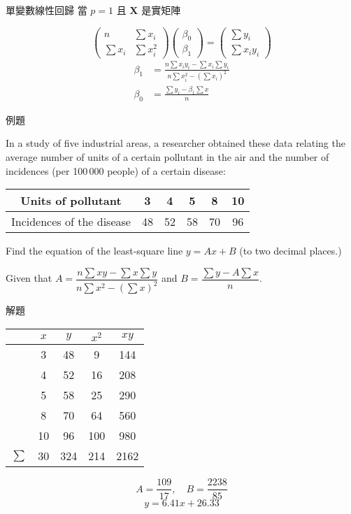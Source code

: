 \documentclass{beamer}
\begin{document}
\begin{CJK}{UTF8}{bsmi}
\begin{frame}{單變數線性回歸}
  當 $p = 1$ 且 $\mathbf X$ 是實矩陣
  \begin{solution}
    \[\begin{pmatrix} n& \sum x_i\\ \sum x_i& \sum x_i^2 \end{pmatrix}\begin{pmatrix} \beta_0\\ \beta_1 \end{pmatrix}
	= \begin{pmatrix} \sum y_i\\ \sum x_iy_i \end{pmatrix}\]
    \begin{align*}
      \beta_1 &= \frac{n \sum x_iy_i - \sum x_i \sum y_i}{n \sum x_i^2 - \left( \sum x_i \right)^2}\\
      \beta_0 &= \frac{\sum y_i - \beta_1 \sum x}{n}
    \end{align*}
  \end{solution}
\end{frame}

\begin{frame}{例題}
  \begin{example}
    In a study of five industrial areas, a researcher obtained these data relating the average number of units of a certain
    pollutant in the air and the number of incidences (per 100\,000 people) of a certain disease:
    \begin{center}
      \begin{tabular}{c|ccccc}
	Units of pollutant       &  3&  4&  5&  8& 10\\
	\hline
	Incidences of the disease& 48& 52& 58& 70& 96
      \end{tabular}
    \end{center}
    Find the equation of the least-square line $y = Ax + B$ (to two decimal places.)
    \centerline{Given that $A = \dfrac{n \sum xy - \sum x \sum y}{n \sum x^2 - (\sum x)^2}$ and $B
	= \dfrac{\sum y - A \sum x}{n}.$}
  \end{example}
\end{frame}

\begin{frame}{解題}
  \begin{solution}
    \begin{center}
      \begin{tabular}{ccccc}
	      & $x$& $y$& $x^2$& $xy$\\
	\hline
	      &   3&  48&     9&  144\\
	      &   4&  52&    16&  208\\
	      &   5&  58&    25&  290\\
	      &   8&  70&    64&  560\\
	      &  10&  96&   100&  980\\
	\hline
	$\sum$&  30& 324&   214& 2162
      \end{tabular}
    \end{center}
    \[A = \frac{109}{17},\quad B = \frac{2238}{85}\]
    \[y = 6.41 x + 26.33\]
  \end{solution}
\end{frame}


\end{CJK}
\end{document}
